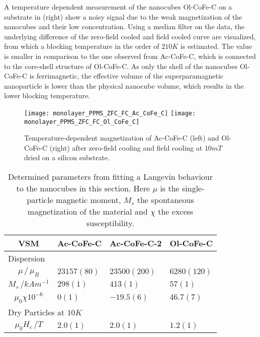 \documentclass[\main/dresen_thesis.tex]{subfiles}
\begin{document}
  A temperature dependent measurement of the nanocubes Ol-CoFe-C on a substrate in  (right) show a noisy signal due to the weak magnetization of the nanocubes and their low concentration.
  Using a median filter on the data, the underlying difference of the zero-field cooled and field cooled curve are visualized, from which a blocking temperature in the order of $210 \unit{K}$ is estimated.
  The value is smaller in comparison to the one observed from Ac-CoFe-C, which is connected to the core-shell structure of Ol-CoFe-C.
  As only the shell of the nanocubes Ol-CoFe-C is ferrimagnetic, the effective volume of the superparamagnetic nanoparticle is lower than the physical nanocube volume, which results in the lower blocking temperature.

  \begin{figure}[tb]
    \centering
    \texttt{[image: monolayer\_PPMS\_ZFC\_FC\_Ac\_CoFe\_C]}
    \texttt{[image: monolayer\_PPMS\_ZFC\_FC\_Ol\_CoFe\_C]}
    \caption{\label{fig:monolayers:nanoparticle:vsm10K}Temperature-dependent magnetization of Ac-CoFe-C (left) and Ol-CoFe-C (right) after zero-field cooling and field cooling at $10 \unit{mT}$ dried on a silicon substrate.}
  \end{figure}

  \begin{table}[!htbp]
    \centering
    \caption{\label{tab:monolayers:nanoparticle:vsm}Determined parameters from fitting a Langevin behaviour to the nanocubes in this section. Here $\mu$ is the single-particle magnetic moment, $M_s$ the spontaneous magnetization of the material and $\chi$ the excess susceptibility.}
    \begin{tabular}{ c | l | l | l}
      \rule{0pt}{2ex} \textbf{VSM} & Ac-CoFe-C & Ac-CoFe-C-2 & Ol-CoFe-C \\
      \hline
      \multicolumn{4}{l}{Dispersion} \\
      \hline
      \rule{0pt}{2ex} $\mu \, / \, \mu_B$         & $23157(80)$   & $23500(200)$ & $6280(120)$\\
      \rule{0pt}{2ex} $M_s \, /  \unit{kAm^{-1}}$ & $298(1)$      & $413(1)$     & $57(1)$\\
      \rule{0pt}{2ex} $\mu_0 \chi \unit{10^{-6}}$ & $0(1)$        & $-19.5(6)$   & $46.7(7)$\\
      \hline
      \multicolumn{4}{l}{Dry Particles at $10 \unit{K}$} \\
      \hline
      \rule{0pt}{2ex} $\mu_0 H_c \, /  \unit{T}$  & $2.0(1)$      & $2.0(1)$      & $1.2(1)$\\
      \hline
    \end{tabular}
  \end{table}
\end{document}

